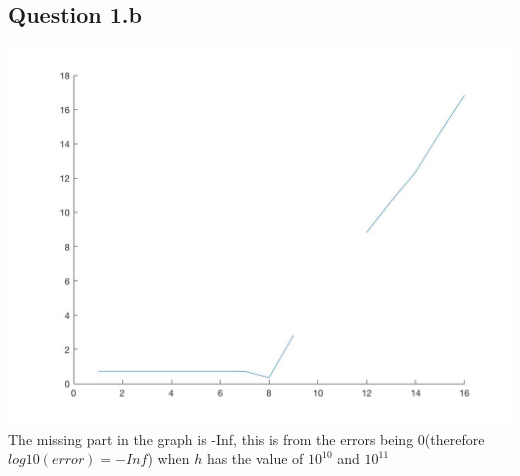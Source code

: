 \documentclass[11pt]{article} %
\begin{document}
\subsection{Question 1.b}
\includegraphics[scale=0.4]{q12.jpg}\\
The missing part in the graph is -Inf, this is from the errors being 0(therefore $log10(error) = -Inf$) when $h$ has the value of $10^{10}$ and $10^{11}$
\end{document}
